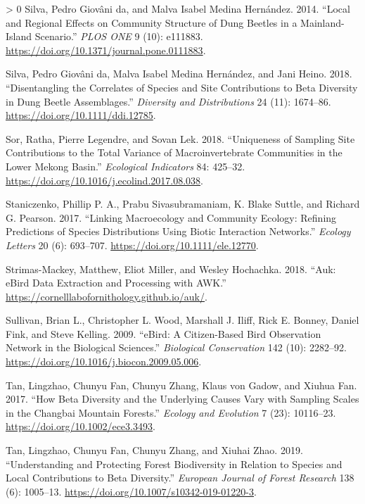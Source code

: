 \documentclass[11pt]{article}
\newlength{\cslhangindent}
\newenvironment{CSLReferences}[3] %
 {%
  \setlength{\parindent}{0pt}
  \ifodd #1 \everypar{\setlength{\hangindent}{\cslhangindent}}\ignorespaces\fi
  \ifnum #2 > 0
  \setlength{\parskip}{#2\baselineskip}
  \fi
 }%
 {}
\begin{document}
\begin{CSLReferences}{1}{0}
\leavevmode\hypertarget{ref-daSilva2014LocReg}{}%
Silva, Pedro Giovâni da, and Malva Isabel Medina Hernández. 2014.
{``Local and Regional Effects on Community Structure of Dung Beetles in
a Mainland-Island Scenario.''} \emph{PLOS ONE} 9 (10): e111883.
\url{https://doi.org/10.1371/journal.pone.0111883}.

\leavevmode\hypertarget{ref-daSilva2018DisCor}{}%
Silva, Pedro Giovâni da, Malva Isabel Medina Hernández, and Jani Heino.
2018. {``Disentangling the Correlates of Species and Site Contributions
to Beta Diversity in Dung Beetle Assemblages.''} \emph{Diversity and
Distributions} 24 (11): 1674--86.
\url{https://doi.org/10.1111/ddi.12785}.

\leavevmode\hypertarget{ref-Sor2018UniSam}{}%
Sor, Ratha, Pierre Legendre, and Sovan Lek. 2018. {``Uniqueness of
Sampling Site Contributions to the Total Variance of Macroinvertebrate
Communities in the Lower Mekong Basin.''} \emph{Ecological Indicators}
84: 425--32. \url{https://doi.org/10.1016/j.ecolind.2017.08.038}.

\leavevmode\hypertarget{ref-Staniczenko2017LinMac}{}%
Staniczenko, Phillip P. A., Prabu Sivasubramaniam, K. Blake Suttle, and
Richard G. Pearson. 2017. {``Linking Macroecology and Community Ecology:
Refining Predictions of Species Distributions Using Biotic Interaction
Networks.''} \emph{Ecology Letters} 20 (6): 693--707.
\url{https://doi.org/10.1111/ele.12770}.

\leavevmode\hypertarget{ref-Strimas-Mackey2018AukEbi}{}%
Strimas-Mackey, Matthew, Eliot Miller, and Wesley Hochachka. 2018.
{``Auk: eBird Data Extraction and Processing with AWK.''}
\url{https://cornelllabofornithology.github.io/auk/}.

\leavevmode\hypertarget{ref-Sullivan2009EbiCit}{}%
Sullivan, Brian L., Christopher L. Wood, Marshall J. Iliff, Rick E.
Bonney, Daniel Fink, and Steve Kelling. 2009. {``eBird: A Citizen-Based
Bird Observation Network in the Biological Sciences.''} \emph{Biological
Conservation} 142 (10): 2282--92.
\url{https://doi.org/10.1016/j.biocon.2009.05.006}.

\leavevmode\hypertarget{ref-Tan2017HowBet}{}%
Tan, Lingzhao, Chunyu Fan, Chunyu Zhang, Klaus von Gadow, and Xiuhua
Fan. 2017. {``How Beta Diversity and the Underlying Causes Vary with
Sampling Scales in the Changbai Mountain Forests.''} \emph{Ecology and
Evolution} 7 (23): 10116--23. \url{https://doi.org/10.1002/ece3.3493}.

\leavevmode\hypertarget{ref-Tan2019UndPro}{}%
Tan, Lingzhao, Chunyu Fan, Chunyu Zhang, and Xiuhai Zhao. 2019.
{``Understanding and Protecting Forest Biodiversity in Relation to
Species and Local Contributions to Beta Diversity.''} \emph{European
Journal of Forest Research} 138 (6): 1005--13.
\url{https://doi.org/10.1007/s10342-019-01220-3}.


\end{CSLReferences}
\end{document}
